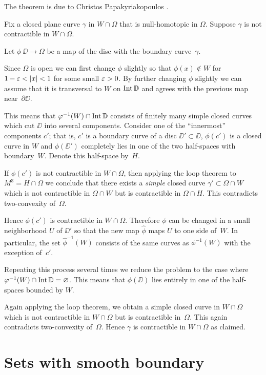 The theorem is due to Christos Papakyriakopoulos \cite[a proof can be found in][]{hatcher}. 

Fix a closed plane curve $\gamma$ in $W\cap \Omega$ that  is null-homotopic in $\Omega$. Suppose $\gamma$ is not contractible in  $W\cap \Omega$.

Let $\phi\: \DD\to\Omega$ be a map of the disc with the boundary curve~$\gamma$.

Since $\Omega$ is open we can first change  $\phi$  slightly so that $\phi(x)\notin W$ for $1-\eps\z<|x|\z<1$ for some small $\varepsilon>0$.
By further changing $\phi$ slightly we can assume that it is transversal to $W$  on  $\operatorname{\rm Int}\nolimits \mathbb{D}$ and agrees with the previous map near~$\partial \DD$.

This means that $\varphi^{-1} (W)\cap \operatorname{\rm Int}\nolimits \mathbb{D}$ consists of finitely many simple closed curves which cut $\DD$ into several components. 
Consider one of the ``innermost'' components $c'$;
that is, $c'$ is a boundary curve of a disc $\DD'\subset \DD$,
$\phi(c')$ is a closed curve in $W$ and $\phi(\DD')$  completely lies in one of the two half-spaces  with boundary~$W$. 
Denote this half-space by~$H$.

If $\phi(c')$ is not contractible in $W\cap \Omega$, then applying the loop theorem to $M^3=H\cap \Omega$ we conclude that  there exists a {}\emph{simple} closed curve $\gamma'\subset \Omega\cap W$ which is not contractible in $\Omega\cap W$ but is contractible in $\Omega\cap H$. 
This contradicts two-convexity of~$\Omega$. 

Hence $\phi(c')$ is contractible in $W\cap \Omega$. Therefore $\phi$ can be changed in a small neighborhood $U$ of $\DD'$ so that the new map $\hat\phi$ maps $U$ to one side of~$W$. 
In particular, the set $\hat\phi^{-1}(W)$ consists of the same curves as $\phi^{-1} (W)$ with the exception of~$c'$.

Repeating this process several times we reduce the problem to the case where $\varphi^{-1} (W)\cap \operatorname{\rm Int}\nolimits \mathbb{D}=\varnothing$.
This means that $\phi(\DD)$ lies entirely in one of the half-spaces bounded by $W$.

Again applying the loop theorem, we obtain a simple closed curve in $W\cap \Omega$ which is not contractible in $W\cap \Omega$ but is contractible in~$\Omega$. 
This again contradicts two-convexity of~$\Omega$. 
Hence $\gamma$ is contractible in  $W\cap \Omega$ as claimed.
\qeds

\section{Sets with smooth boundary}\label{sec:smooth-bry}

